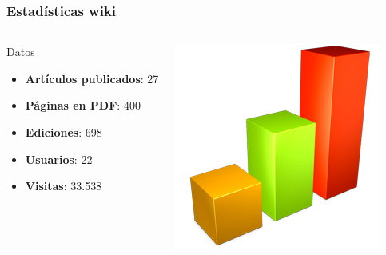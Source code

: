 \documentclass[green]{beamer}
\begin{document}
\begin{frame}
    \frametitle{Estadísticas wiki}

    \begin{columns}[t]
    \column{150pt}
        
	\begin{block}{Datos}
            \begin{itemize}
		\item \textbf{Artículos publicados}: 27
                \item \textbf{Páginas en PDF}: 400
		\item \textbf{Ediciones}: 698
		\item \textbf{Usuarios}: 22
		\item \textbf{Visitas}: 33.538
            \end{itemize}            
        \end{block}

    \column{150pt}

	\begin{center}
	    \includegraphics[scale=0.25]{img/estadisticas.png}
	\end{center}

    \end{columns} 

\end{frame}
\end{document}
